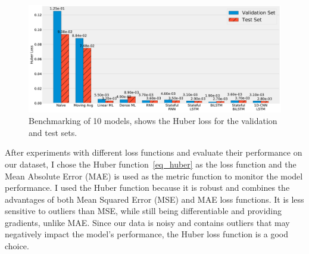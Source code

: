 \begin{figure}[htp]
	\centering
    \includegraphics[width=\textwidth]{chapter4/figs/models_benchmark.pdf}
    \caption{Benchmarking of 10 models, shows the Huber loss for the validation and test sets.}
\label{fig_benchmark}
\end{figure}

After experiments with different loss functions and evaluate their performance on our dataset, I chose the Huber function~\ref{eq_huber} as the loss function and the Mean Absolute Error (MAE) is used as the metric function to monitor the model performance.
I used the Huber function because it is robust and combines the advantages of both Mean Squared Error (MSE) and MAE loss functions. It is less sensitive to outliers than MSE, while still being differentiable and providing gradients, unlike MAE. Since our data is noisy and contains outliers that may negatively impact the model's performance, the Huber loss function is a good choice.

